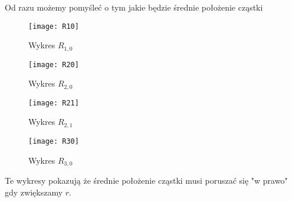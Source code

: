 Od razu możemy pomyśleć o tym jakie będzie średnie położenie cząstki
\begin{figure}[htb]
	\centering
	\begin{minipage}[t]{0.47\textwidth}
		\centering
		\texttt{[image: R10]}
		\caption{Wykres $R_{1, 0}$}
		\label{fig:R10}
	\end{minipage}
	\hspace{0.04\textwidth}
	\begin{minipage}[t]{0.47\textwidth}
		\centering
		\texttt{[image: R20]}
		\caption{Wykres $R_{2, 0}$}
		\label{fig:R20}
	\end{minipage}
\end{figure}
\begin{figure}[htb]
	\centering
	\begin{minipage}[t]{0.47\textwidth}
		\centering
		\texttt{[image: R21]}
		\caption{Wykres $R_{2, 1}$}
		\label{fig:R21}
	\end{minipage}
	\hspace{0.04\textwidth}
	\begin{minipage}[t]{0.47\textwidth}
		\centering
		\texttt{[image: R30]}
		\caption{Wykres $R_{3, 0}$}
		\label{fig:R30}
	\end{minipage}
\end{figure}

Te wykresy pokazują że średnie położenie cząstki musi poruszać się "w prawo" gdy zwiększamy $r$.
